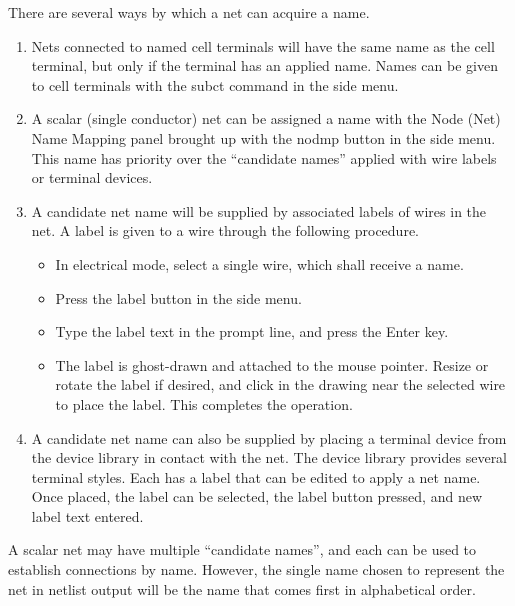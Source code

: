 There are several ways by which a net can acquire a name.
\begin{enumerate}
\item{Nets connected to named cell terminals will have the same name
as the cell terminal, but only if the terminal has an applied name. 
Names can be given to cell terminals with the {\cb subct} command in
the side menu.}

\item{A scalar (single conductor) net can be assigned a name with the
{\cb Node (Net) Name Mapping} panel brought up with the {\cb nodmp}
button in the side menu.  This name has priority over the ``candidate
names'' applied with wire labels or terminal devices.}

\item{A candidate net name will be supplied by associated labels of
wires in the net.  A label is given to a wire through the
    following procedure.

\begin{itemize}
\item{In electrical mode, select a single wire, which shall receive a
name.}

\item{Press the {\cb label} button in the side menu.}

\item{Type the label text in the prompt line, and press the {\kb
Enter} key.}

\item{The label is ghost-drawn and attached to the mouse pointer. 
Resize or rotate the label if desired, and click in the drawing near
the selected wire to place the label.  This completes the operation.}
\end{itemize} }

\item{A candidate net name can also be supplied by placing a terminal
device from the device library in contact with the net.  The device
library provides several terminal styles.  Each has a label that can
be edited to apply a net name.  Once placed, the label can be
selected, the {\cb label} button pressed, and new label text entered.}
\end{enumerate}

A scalar net may have multiple ``candidate names'', and each can be
used to establish connections by name.  However, the single name
chosen to represent the net in netlist output will be the name that
comes first in alphabetical order.

